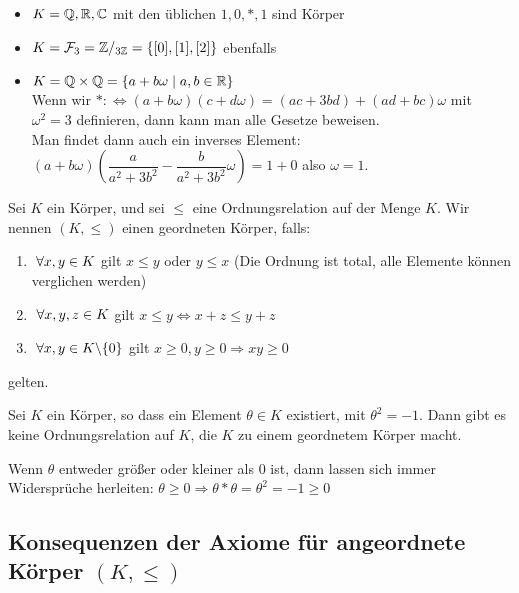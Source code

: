 \documentclass[main.tex]{subfiles}
\begin{document}
\begin{Beispiel}
  \begin{itemize}
    \item $ K =\mathbb{Q}, \mathbb{R}, \mathbb{C}$ mit den üblichen $1,0,*,1$ sind Körper
    \item $K = \mathcal{F}_3=\mathbb{Z}/_{3\mathbb{Z}} = \{[0],[1],[2]\}$ ebenfalls
    \item $K = \mathbb{Q} \times \mathbb{Q} = \{a+b\omega \mid a,b \in \mathbb{R}\}$\\
    Wenn wir $* :\Leftrightarrow (a+b\omega)(c+d\omega) = (ac + 3 bd ) + (ad+bc) \omega$ mit $\omega^2 =3$ definieren, dann kann man alle Gesetze beweisen.\\
    Man findet dann auch ein inverses Element: $(a+b\omega)(\dfrac{a}{a^2+3b^2}-\dfrac{b}{a^2+3b^2} \omega ) = 1+ 0$ also $\omega = 1$.
  \end{itemize}
\end{Beispiel}

\begin{Definition}
  Sei $K$ ein Körper, und sei $\leq$ eine Ordnungsrelation auf der Menge $K$. Wir nennen $(K,\leq)$ einen geordneten Körper, falls:\\
  \begin{Theorem}[Körperaxiome]
    \begin{enumerate}
      \item $\;\forall x,y \in K$ gilt $x \leq y$ oder $y\leq x$ (Die Ordnung ist total, alle Elemente können verglichen werden)
      \item $\;\forall x,y,z \in K$ gilt $x \leq y \Leftrightarrow x+z \leq y+z$
      \item $\;\forall x,y \in K \backslash \{0\}$ gilt $x\geq 0, y\geq 0 \Rightarrow xy \geq 0$
    \end{enumerate}
  \end{Theorem}
  gelten.
\end{Definition}

\begin{Beispiel}
  Sei $K$ ein Körper, so dass ein Element $\theta \in K$ existiert, mit $\theta^2 =-1$. Dann gibt es keine Ordnungsrelation auf $K$, die $K$ zu einem geordnetem Körper macht.

  Wenn $\theta$ entweder größer oder kleiner als $0$ ist, dann lassen sich immer Widersprüche herleiten: $\theta \geq 0 \Rightarrow \theta* \theta = \theta^2 = -1 \geq 0 $\lightning
\end{Beispiel}

\subsection{Konsequenzen der Axiome für angeordnete Körper $(K,\leq)$}
\end{document}
